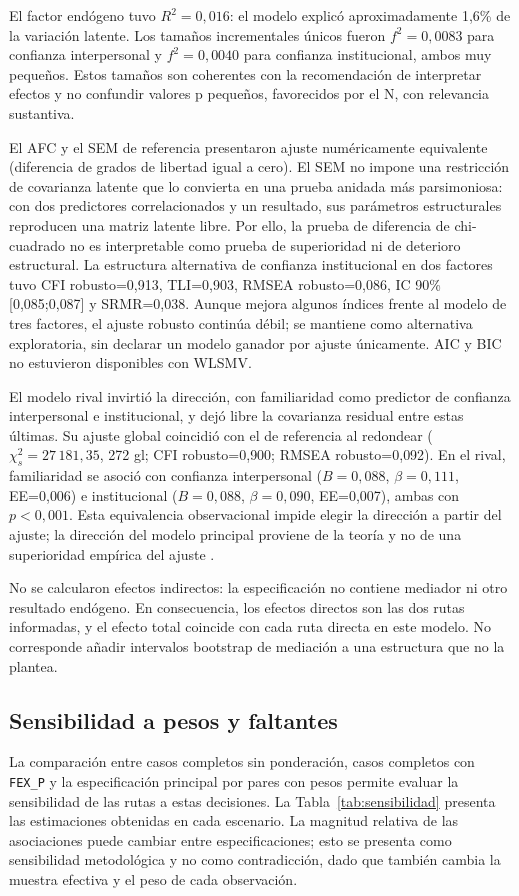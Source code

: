 \documentclass[11pt,letterpaper]{article}
\begin{document}
El factor endógeno tuvo \(R^2=0{,}016\): el modelo explicó aproximadamente 1,6\% de la variación latente. Los tamaños incrementales únicos fueron \(f^2=0{,}0083\) para confianza interpersonal y \(f^2=0{,}0040\) para confianza institucional, ambos muy pequeños. Estos tamaños son coherentes con la recomendación de interpretar efectos y no confundir valores p pequeños, favorecidos por el N, con relevancia sustantiva.



El AFC y el SEM de referencia presentaron ajuste numéricamente equivalente (diferencia de grados de libertad igual a cero). El SEM no impone una restricción de covarianza latente que lo convierta en una prueba anidada más parsimoniosa: con dos predictores correlacionados y un resultado, sus parámetros estructurales reproducen una matriz latente libre. Por ello, la prueba de diferencia de chi-cuadrado no es interpretable como prueba de superioridad ni de deterioro estructural. La estructura alternativa de confianza institucional en dos factores tuvo CFI robusto=0{,}913, TLI=0{,}903, RMSEA robusto=0{,}086, IC 90\% [0{,}085;0{,}087] y SRMR=0{,}038. Aunque mejora algunos índices frente al modelo de tres factores, el ajuste robusto continúa débil; se mantiene como alternativa exploratoria, sin declarar un modelo ganador por ajuste únicamente. AIC y BIC no estuvieron disponibles con WLSMV.

El modelo rival invirtió la dirección, con familiaridad como predictor de confianza interpersonal e institucional, y dejó libre la covarianza residual entre estas últimas. Su ajuste global coincidió con el de referencia al redondear (\(\chi^2_s=27\,181{,}35\), 272 gl; CFI robusto=0{,}900; RMSEA robusto=0{,}092). En el rival, familiaridad se asoció con confianza interpersonal (\(B=0{,}088\), \(\beta=0{,}111\), EE=0{,}006) e institucional (\(B=0{,}088\), \(\beta=0{,}090\), EE=0{,}007), ambas con \(p<0{,}001\). Esta equivalencia observacional impide elegir la dirección a partir del ajuste; la dirección del modelo principal proviene de la teoría y no de una superioridad empírica del ajuste \citep{MacCallum1993}.

No se calcularon efectos indirectos: la especificación no contiene mediador ni otro resultado endógeno. En consecuencia, los efectos directos son las dos rutas informadas, y el efecto total coincide con cada ruta directa en este modelo. No corresponde añadir intervalos bootstrap de mediación a una estructura que no la plantea.

\subsection{Sensibilidad a pesos y faltantes}
La comparación entre casos completos sin ponderación, casos completos con \texttt{FEX\_P} y la especificación principal por pares con pesos permite evaluar la sensibilidad de las rutas a estas decisiones. La Tabla~\ref{tab:sensibilidad} presenta las estimaciones obtenidas en cada escenario. La magnitud relativa de las asociaciones puede cambiar entre especificaciones; esto se presenta como sensibilidad metodológica y no como contradicción, dado que también cambia la muestra efectiva y el peso de cada observación.

\end{document}
